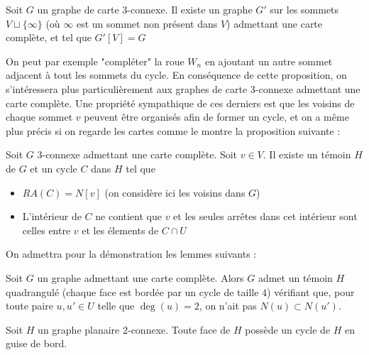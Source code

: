 \documentclass{scrartcl}
\begin{document}
\begin{flushleft}
\begin{prop}\label{3connCompl}
    Soit $G$ un graphe de carte $3$-connexe. Il existe un graphe $G'$ sur les sommets $V \sqcup \{\infty\}$ (où $\infty$ est un sommet non
    présent dans $V$) admettant une carte complète, et tel que $G'[V] = G$
\end{prop}

On peut par exemple "compléter" la roue $W_n$ en ajoutant un autre sommet adjacent à tout les sommets du cycle.
En conséquence de cette proposition, on s'intéressera plus particulièrement aux graphes de carte $3$-connexe admettant une carte complète.
Une propriété sympathique de ces derniers est que les voisins de chaque sommet $v$ peuvent être organisés afin
de former un cycle, et on a même plus précis si on regarde les cartes comme le montre la proposition suivante :

\begin{prop}\label{cyclSep}
    Soit $G$ $3$-connexe admettant une carte complète. Soit $v \in V$. Il existe un témoin $H$ de $G$ et
    un cycle $C$ dans $H$ tel que
    \begin{itemize}
        \item $RA(C) = N[v]$ (on considère ici les voisins dans $G$)
        \item L'intérieur de $C$ ne contient que $v$ et les seules arrêtes dans cet intérieur sont celles entre $v$ et
        les élements de $C \cap U$
    \end{itemize}
\end{prop}

On admettra pour la démonstration les lemmes suivants :

\begin{lem}
    Soit $G$ un graphe admettant une carte complète. Alors $G$ admet un témoin $H$ quadrangulé (chaque face est bordée par un cycle
    de taille $4$) vérifiant que, pour toute paire $u, u' \in U$ telle que $\deg(u) = 2$, on n'ait pas $N(u) \subset N(u')$.
\end{lem}

\begin{lem}
    Soit $H$ un graphe planaire $2$-connexe. Toute face de $H$ possède un cycle de $H$ en guise de bord.
\end{lem}


\end{flushleft}
\end{document}
